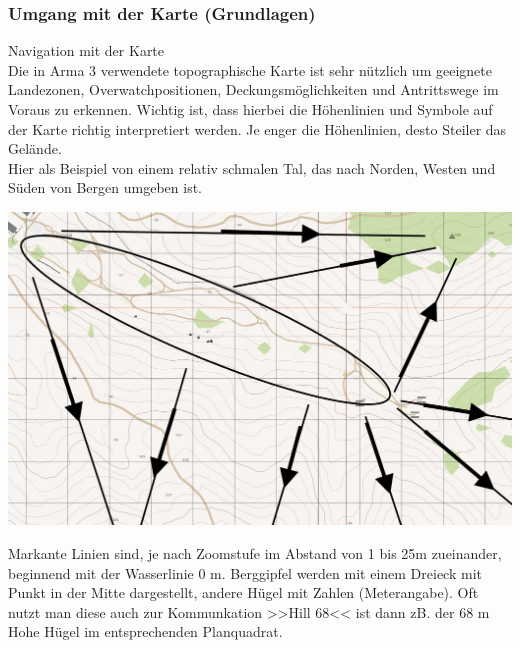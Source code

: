 \newpage

\subsubsection{Umgang mit der Karte (Grundlagen)}

	Navigation mit der Karte \\

	Die in Arma 3 verwendete topographische Karte ist sehr nützlich um geeignete Landezonen, Overwatchpositionen, Deckungsmöglichkeiten und Antrittswege im Voraus zu erkennen. Wichtig ist, dass hierbei die Höhenlinien und Symbole auf der Karte richtig interpretiert werden. Je enger die Höhenlinien, desto Steiler das Gelände. \\

 

	Hier als Beispiel von einem relativ schmalen Tal, das nach Norden, Westen und Süden von Bergen umgeben ist. \\
\begin{minipage}[t]{1\textwidth}
	\includegraphics[width=\textwidth]{./Grafiken/KarteUndMarkierungen/Karte1.png}
\end{minipage}

	Markante Linien sind, je nach Zoomstufe im Abstand von 1 bis 25m zueinander, beginnend mit der Wasserlinie 0 m. Berggipfel werden mit einem Dreieck mit Punkt in der Mitte dargestellt, andere Hügel mit Zahlen (Meterangabe). Oft nutzt man diese auch zur Kommunkation >>Hill 68<< ist dann zB. der 68 m Hohe Hügel im entsprechenden Planquadrat. \\

